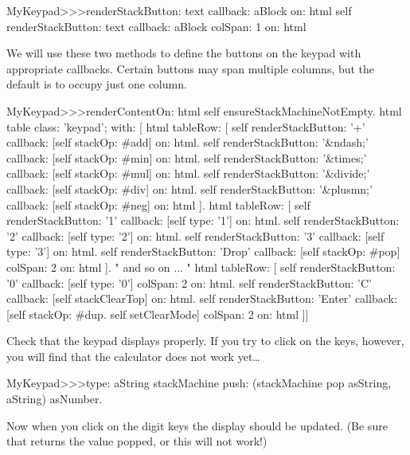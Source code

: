 \documentclass[a4paper,10pt,twoside]{book}
\begin{document}
{{\begin{code}{}
MyKeypad>>>renderStackButton: text callback: aBlock on: html 
	self 
		renderStackButton: text
		callback: aBlock
		colSpan: 1
		on: html
\end{code}

We will use these two methods to define the buttons on the keypad with appropriate callbacks.
Certain buttons may span multiple columns, but the default is to occupy just one column.


\begin{code}{}
MyKeypad>>>renderContentOn: html 
  self ensureStackMachineNotEmpty.
  html table
    class: 'keypad';
    with: [
      html tableRow: [
          self renderStackButton: '+' callback: [self stackOp: #add] on: html.
          self renderStackButton: '&ndash;' callback: [self stackOp: #min] on: html.
          self renderStackButton: '&times;' callback: [self stackOp: #mul] on: html.
          self renderStackButton: '&divide;' callback: [self stackOp: #div] on: html.
          self renderStackButton: '&plusmn;' callback: [self stackOp: #neg] on: html ].
        html tableRow: [
          self renderStackButton: '1' callback: [self type: '1'] on: html.
          self renderStackButton: '2' callback: [self type: '2'] on: html.
          self renderStackButton: '3' callback: [self type: '3'] on: html.
          self renderStackButton: 'Drop' callback: [self stackOp: #pop]
          	colSpan: 2 on: html ].
" and so on ... "
        html tableRow: [
          self renderStackButton: '0' callback: [self type: '0'] colSpan: 2 on: html.
          self renderStackButton: 'C' callback: [self stackClearTop] on: html.
          self renderStackButton: 'Enter'
          	callback: [self stackOp: #dup. self setClearMode]
			colSpan: 2 on: html ]]
\end{code}

Check that the keypad displays properly.
If you try to click on the keys, however, you will find that the calculator does not work yet\ldots{}

\begin{code}{}
MyKeypad>>>type: aString
	stackMachine push: (stackMachine pop asString, aString) asNumber.
\end{code}
Now when you click on the digit keys the display should be updated.
(Be sure that  returns the value popped, or this will not work!)


}}
\end{document}
